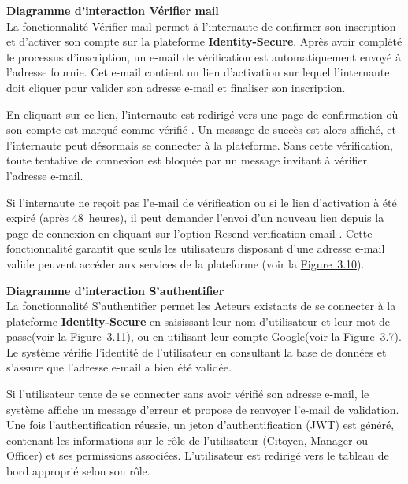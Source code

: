 \medskip

\noindent\textbf{\textendash{} Diagramme d'interaction \og Vérifier mail \fg{}}\\
\hspace{1em}La fonctionnalité \og Vérifier mail \fg{} permet à l'internaute de confirmer son inscription et d'activer son compte sur la plateforme \textbf{Identity-Secure}. Après avoir complété le processus d'inscription, un e-mail de vérification est automatiquement envoyé à l'adresse fournie. Cet e-mail contient un lien d'activation sur lequel l'internaute doit cliquer pour valider son adresse e-mail et finaliser son inscription.

\hspace{1em}En cliquant sur ce lien, l'internaute est redirigé vers une page de confirmation où son compte est marqué comme \og vérifié \fg{}. Un message de succès est alors affiché, et l'internaute peut désormais se connecter à la plateforme. Sans cette vérification, toute tentative de connexion est bloquée par un message invitant à vérifier l'adresse e-mail.

\hspace{1em}Si l'internaute ne reçoit pas l'e-mail de vérification ou si le lien d'activation à été expiré (après 48~heures), il peut demander l'envoi d'un nouveau lien depuis la page de connexion en cliquant sur l'option \og Resend verification email \fg{}. Cette fonctionnalité garantit que seuls les utilisateurs disposant d'une adresse e-mail valide peuvent accéder aux services de la plateforme (voir la \hyperref[fig:3.10]{Figure~3.10}).

\medskip

\noindent\textbf{\textendash{} Diagramme d'interaction \og S'authentifier \fg{}}\\
\hspace{1em}La fonctionnalité \og S'authentifier \fg{} permet les Acteurs existants de se connecter à la plateforme \textbf{Identity-Secure} en saisissant leur nom d'utilisateur et leur mot de passe(voir la \hyperref[fig:3.11]{Figure~3.11}), ou en utilisant leur compte Google(voir la \hyperref[fig:3.7]{Figure~3.7}). Le système vérifie l'identité de l'utilisateur en consultant la base de données et s'assure que l'adresse e-mail a bien été validée.

\hspace{1em}Si l'utilisateur tente de se connecter sans avoir vérifié son adresse e-mail, le système affiche un message d'erreur et propose de renvoyer l'e-mail de validation. Une fois l'authentification réussie, un jeton d'authentification (JWT) est généré, contenant les informations sur le rôle de l'utilisateur (Citoyen, Manager ou Officer) et ses permissions associées. L'utilisateur est redirigé vers le tableau de bord approprié selon son rôle.

